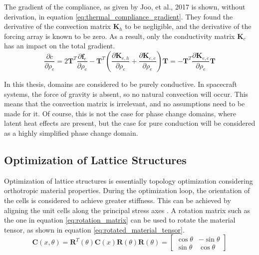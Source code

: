 The gradient of the compliance, as given by Joo, et al., 2017 \cite{Joo_Lee_Kim_2017} is shown, without derivation, in equation \ref{eq:thermal_compliance_gradient}. They found the derivative of the convection matrix $\mathbf{K}_h$ to be negligible, and the derivative of the forcing array is known to be zero. As a result, only the conductivity matrix $\mathbf{K}_c$ has an impact on the total gradient.
\begin{equation}
    \frac{\partial c}{\partial \rho_e} = 2\mathbf{T}^T\frac{\partial\mathbf{f}_e}{\partial\rho_e}-\mathbf{T}^T\left( \frac{\partial\mathbf{K}_{e,h}}{\partial\rho_e} + \frac{\partial\mathbf{K}_{e,c}}{\partial\rho_e} \right)\mathbf{T} = -\mathbf{T}^T\frac{\partial\mathbf{K}_{e,c}}{\partial\rho_e}\mathbf{T}
    \label{eq:thermal_compliance_gradient}
\end{equation}

In this thesis, domains are considered to be purely conductive. In spacecraft systems, the force of gravity is absent, so no natural convection will occur. This means that the convection matrix is irrelevant, and no assumptions need to be made for it. Of course, this is not the case for phase change domains, where latent heat effects are present, but the case for pure conduction will be considered as a highly simplified phase change domain.

\subsection*{Optimization of Lattice Structures}
Optimization of lattice structures is essentially topology optimization considering orthotropic material properties. During the optimization loop, the orientation of the cells is considered to achieve greater stiffness. This can be achieved by aligning the unit cells along the principal stress axes \cite{Groen_Sigmund_2017}. A rotation matrix such as the one in equation \ref{eq:rotation_matrix} can be used to rotate the material tensor, as shown in equation \ref{eq:rotated_material_tensor}.
\begin{subequations}
    \begin{equation}
        \mathbf{C}(x,\theta) = \mathbf{R}^T(\theta) \mathbf{C}(x) \mathbf{R}(\theta)
        \label{eq:rotated_material_tensor}
    \end{equation}
    \begin{equation}
        \mathbf{R}(\theta) = \begin{bmatrix}
            \cos \theta & -\sin \theta \\
            \sin \theta & \cos \theta
            \label{eq:rotation_matrix}
        \end{bmatrix}
    \end{equation}
\end{subequations}

